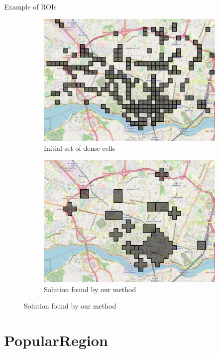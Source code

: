 \documentclass[10pt]{beamer}
\begin{document}
\begin{frame}{Example of ROIs}
\begin{figure}
    \begin{subfigure}{0.49\textwidth}
        \includegraphics[scale=0.2]{figures/map/grid-init.pdf}
        \caption{Initial set of dense cells}
    \end{subfigure}
    \begin{subfigure}{0.49\textwidth}
        \includegraphics[scale=0.2]{figures/map/grid-ilp.pdf}
        \caption{Solution found by our method}
    \end{subfigure}
\end{figure}
\end{frame}

\section{PopularRegion}
\end{document}
